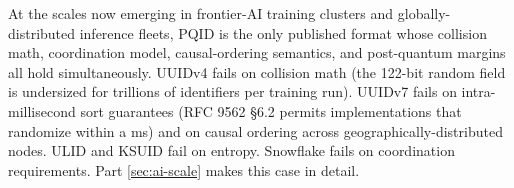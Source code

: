 \begin{calloutinfo}
At the scales now emerging in frontier-AI training clusters and globally-distributed inference fleets, PQID is the only published format whose collision math, coordination model, causal-ordering semantics, and post-quantum margins all hold simultaneously. UUIDv4 fails on collision math (the 122-bit random field is undersized for trillions of identifiers per training run). UUIDv7 fails on intra-millisecond sort guarantees (RFC 9562 §6.2 permits implementations that randomize within a ms) and on causal ordering across geographically-distributed nodes. ULID and KSUID fail on entropy. Snowflake \citep{snowflake} fails on coordination requirements. Part \ref{sec:ai-scale} makes this case in detail.
\end{calloutinfo}

